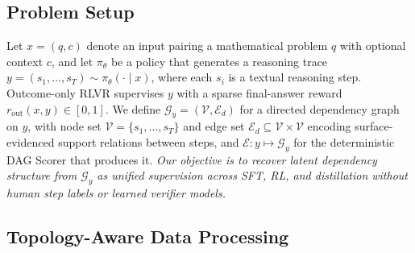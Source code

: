 \subsection{Problem Setup}
Let $x=(q,c)$ denote an input pairing a mathematical problem $q$ with optional context $c$, and let $\pi_\theta$ be a policy that generates a reasoning trace $y=(s_1,\dots,s_T)\sim\pi_\theta(\cdot\!\mid\!x)$, where each $s_i$ is a textual reasoning step. Outcome-only RLVR supervises $y$ with a sparse final-answer reward $r_{\mathrm{out}}(x,y)\!\in\![0,1]$.
We define $\mathcal{G}_y=(\mathcal{V},\mathcal{E}_d)$ for a directed dependency graph on $y$, with node set $\mathcal{V}=\{s_1,\dots,s_T\}$ and edge set $\mathcal{E}_d\subseteq\mathcal{V}\!\times\!\mathcal{V}$ encoding surface-evidenced support relations between steps, and $\mathcal{E}:y\!\mapsto\!\mathcal{G}_y$ for the deterministic DAG Scorer that produces it. %
\textit{Our objective is to recover latent dependency structure from $\mathcal{G}_y$ as unified supervision across SFT, RL, and distillation without human step labels or learned verifier models.
}

\subsection{Topology-Aware Data Processing}
\label{sec:reward_module}


